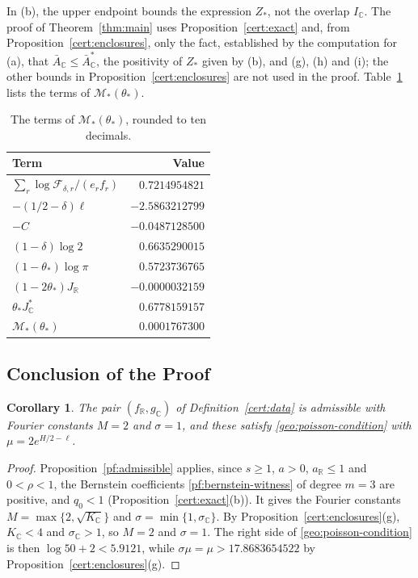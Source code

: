 \documentclass[11pt]{amsart}
\numberwithin{equation}{section}
\newtheorem{corollary}[equation]{Corollary}
\theoremstyle{definition}
\theoremstyle{remark}
\newcommand{\R}{\mathbb R}
\newcommand{\C}{\mathbb C}
\begin{document}
In (b), the upper endpoint bounds the expression $Z_*$, not the overlap
$I_\C$. The proof of Theorem~\ref{thm:main} uses
Proposition~\ref{cert:exact} and, from
Proposition~\ref{cert:enclosures}, only the fact, established by the computation for (a), that
$\bar A_\C\le\bar A_\C^*$, the positivity of $Z_*$ given by (b), and (g), (h) and (i); the other bounds
in Proposition~\ref{cert:enclosures} are not used in the proof.
Table~\ref{cert:tab-budget} lists the terms of $\mathcal M_*(\theta_*)$.

\begin{table}[htbp]
\centering\small
\caption{The terms of $\mathcal M_*(\theta_*)$, rounded to ten decimals.}
\label{cert:tab-budget}
\begin{tabular}{lr}
\toprule
Term & Value\\
\midrule
$\sum_r\log\mathcal F_{\delta,r}/(e_rf_r)$ & $0.7214954821$\\
$-(1/2-\delta)\ell$ & $-2.5863212799$\\
$-C$ & $-0.0487128500$\\
$(1-\delta)\log2$ & $0.6635290015$\\
$(1-\theta_*)\log\pi$ & $0.5723736765$\\
$(1-2\theta_*)J_\R$ & $-0.0000032159$\\
$\theta_*J_\C^*$ & $0.6778159157$\\
\midrule
$\mathcal M_*(\theta_*)$ & $0.0001767300$\\
\bottomrule
\end{tabular}
\end{table}

\subsection{Conclusion of the Proof}

\begin{corollary}\label{cert:fourier}
The pair $(f_\R,g_\C)$ of Definition~\ref{cert:data} is admissible with
Fourier constants $M=2$ and $\sigma=1$, and these satisfy
\eqref{geo:poisson-condition} with $\mu=2e^{H/2-\ell}$.
\end{corollary}

\begin{proof}
Proposition~\ref{pf:admissible} applies, since $s\ge1$, $a>0$,
$a_\R\le1$ and $0<\rho<1$, the Bernstein coefficients
\eqref{pf:bernstein-witness} of degree $m=3$ are positive, and $q_0<1$
(Proposition~\ref{cert:exact}(b)). It gives the Fourier constants
$M=\max\{2,\sqrt{K_\C}\}$ and $\sigma=\min\{1,\sigma_\C\}$. By
Proposition~\ref{cert:enclosures}(g), $K_\C<4$ and $\sigma_\C>1$, so
$M=2$ and $\sigma=1$. The right side of \eqref{geo:poisson-condition} is
then $\log50+2<5.9121$, while $\sigma\mu=\mu>17.8683654522$ by
Proposition~\ref{cert:enclosures}(g).
\end{proof}
\end{document}
